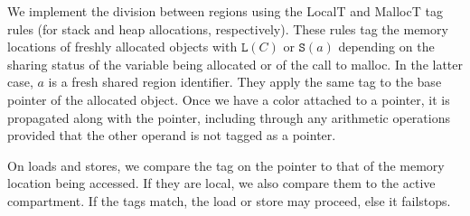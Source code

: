 \documentclass{article}
\begin{document}
We implement the division between regions using the LocalT and MallocT tag rules
(for stack and heap allocations, respectively). These rules tag the memory locations
of freshly allocated objects with \(\mathtt{L}(C)\) or \(\mathtt{S}(a)\) depending
on the sharing status of the variable being allocated or of the call to malloc.
In the latter case, \(a\) is a fresh shared region identifier.
They apply the same tag to the base pointer of the allocated object.
Once we have a color attached to a pointer, it is propagated along
with the pointer, including through any arithmetic operations provided that the other operand
is not tagged as a pointer.

On loads and stores, we compare the tag on the pointer to that of the memory location
being accessed. If they are local, we also compare them to the active compartment.
If the tags match, the load or store may proceed, else it failstops.
\end{document}
